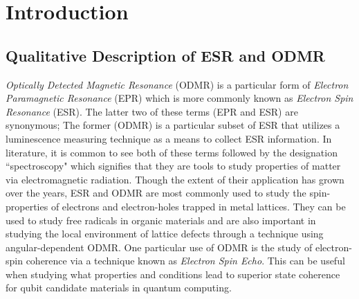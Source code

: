 \documentclass[oneside, astronomy, noacknowlegments]{BYUPhys}
\begin{document}
 \frontmatter

 \makepreliminarypages

 \tableofcontents

 \mainmatter

 \listoffigures 










\chapter{Introduction}

\section{Qualitative Description of ESR and ODMR}
\label{sec:qualitative}

\textit{Optically Detected Magnetic Resonance} (ODMR) is a particular form of \textit{Electron Paramagnetic Resonance} (EPR) which is more commonly known as \textit{Electron Spin Resonance} (ESR). The latter two of these terms (EPR and ESR) are synonymous; The former (ODMR) is a particular subset of ESR that utilizes a luminescence measuring technique as a means to collect ESR information. In literature, it is common to see both of these terms followed by the designation ``spectroscopy" which signifies that they are tools to study properties of matter via electromagnetic radiation. Though the extent of their application has grown over the years, ESR and ODMR are most commonly used to study the spin-properties of electrons and electron-holes trapped in metal lattices. They can be used to study free radicals in organic materials and are also important in studying the local environment of lattice defects through a technique using angular-dependent ODMR. One particular use of ODMR is the study of electron-spin coherence via a technique known as \textit{Electron Spin Echo}. This can be useful when studying what properties and conditions lead to superior state coherence for qubit candidate materials in quantum computing.
\end{document}
